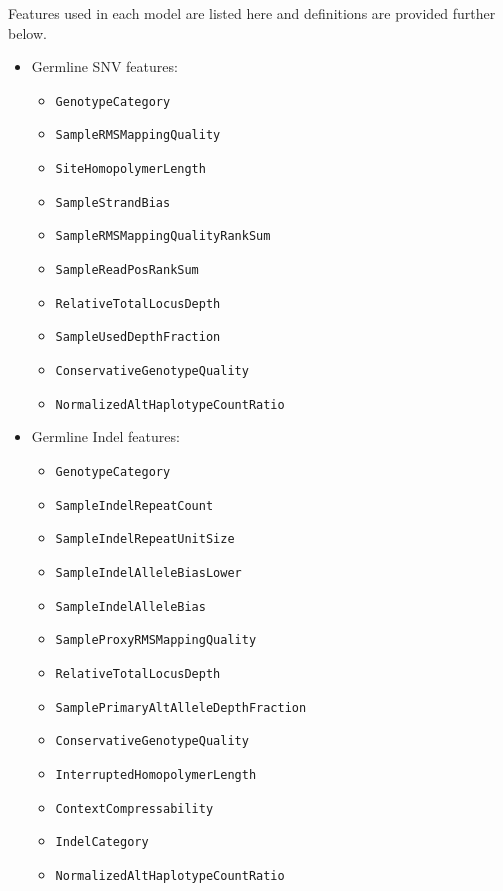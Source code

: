 \documentclass{article}
\begin{document}
Features used in each model are listed here and definitions are provided further below.

\begin{itemize}
    \item Germline SNV features:
    \begin{itemize}
        \item \texttt{GenotypeCategory}
        \item \texttt{SampleRMSMappingQuality}
        \item \texttt{SiteHomopolymerLength}
        \item \texttt{SampleStrandBias}
        \item \texttt{SampleRMSMappingQualityRankSum}
        \item \texttt{SampleReadPosRankSum}
        \item \texttt{RelativeTotalLocusDepth}
        \item \texttt{SampleUsedDepthFraction}
        \item \texttt{ConservativeGenotypeQuality}
        \item \texttt{NormalizedAltHaplotypeCountRatio}
    \end{itemize}
    \item Germline Indel features:
    \begin{itemize}
        \item \texttt{GenotypeCategory}
        \item \texttt{SampleIndelRepeatCount}
        \item \texttt{SampleIndelRepeatUnitSize}
        \item \texttt{SampleIndelAlleleBiasLower}
        \item \texttt{SampleIndelAlleleBias}
        \item \texttt{SampleProxyRMSMappingQuality}
        \item \texttt{RelativeTotalLocusDepth}
        \item \texttt{SamplePrimaryAltAlleleDepthFraction}
        \item \texttt{ConservativeGenotypeQuality}
        \item \texttt{InterruptedHomopolymerLength}
        \item \texttt{ContextCompressability}
        \item \texttt{IndelCategory}
        \item \texttt{NormalizedAltHaplotypeCountRatio}
    \end{itemize}


\end{itemize}
\end{document}
